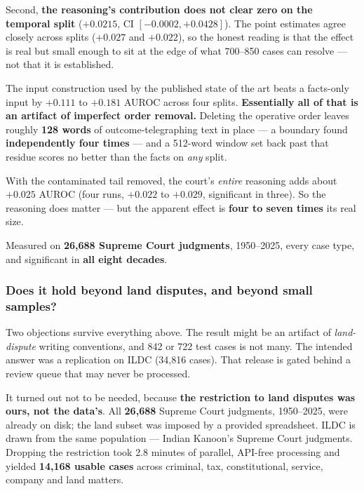 \documentclass[12pt,a4paper]{article}
\begin{document}
Second, \textbf{the reasoning's contribution does not clear zero on the temporal split}
($+0.0215$, CI $[-0.0002, +0.0428]$). The point estimates agree closely across splits
($+0.027$ and $+0.022$), so the honest reading is that the effect is real but small enough to sit at
the edge of what 700--850 cases can resolve --- not that it is established.

\begin{tcolorbox}[plainbox,title={The corrected headline}]
The input construction used by the published state of the art beats a facts-only input by
$+0.111$ to $+0.181$ AUROC across four splits. \textbf{Essentially all of that is an artifact of
imperfect order removal.} Deleting the operative order leaves roughly \textbf{128 words} of
outcome-telegraphing text in place --- a boundary found \textbf{independently four times} --- and a
512-word window set back past that residue scores no better than the facts on \emph{any} split.

\smallskip
With the contaminated tail removed, the court's \emph{entire} reasoning adds about
$\mathbf{+0.025}$ AUROC (four runs, $+0.022$ to $+0.029$, significant in three). So the reasoning
does matter --- but the apparent effect is \textbf{four to seven times} its real size.

\smallskip
Measured on \textbf{26,688 Supreme Court judgments}, 1950--2025, every case type, and significant in
\textbf{all eight decades}.
\end{tcolorbox}

\subsubsection*{Does it hold beyond land disputes, and beyond small samples?}\label{sec:scale}

Two objections survive everything above. The result might be an artifact of \emph{land-dispute}
writing conventions, and 842 or 722 test cases is not many. The intended answer was a replication on
ILDC (34,816 cases). That release is gated behind a review queue that may never be processed.

It turned out not to be needed, because \textbf{the restriction to land disputes was ours, not the
data's}. All \textbf{26,688} Supreme Court judgments, 1950--2025, were already on disk; the land
subset was imposed by a provided spreadsheet. ILDC is drawn from the same population --- Indian
Kanoon's Supreme Court judgments. Dropping the restriction took 2.8 minutes of parallel,
API-free processing and yielded \textbf{14,168 usable cases} across criminal, tax, constitutional,
service, company and land matters.
\end{document}
